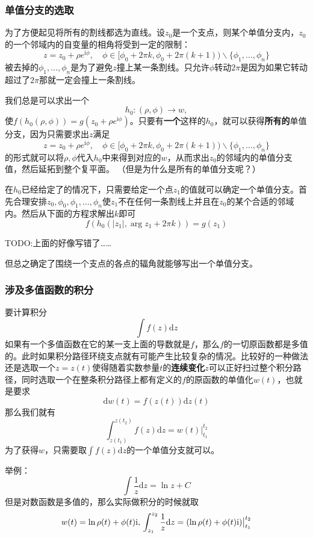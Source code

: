 \documentclass[UTF8]{ctexart}
\begin{document}
\subsubsection{单值分支的选取}
为了方便起见将所有的割线都选为直线。设$z_0$是一个支点，则某个单值分支内，$z_0$的一个邻域内的自变量的相角将受到一定的限制：
\[
z = z_0 + \rho e^{\mathrm{i} \phi}, \quad \phi \in [\phi_0 + 2\pi k, \phi_0 + 2 \pi (k+1)) \backslash \{ \phi_1, \ldots, \phi_n \}
\]
被去掉的$\phi_1, \ldots, \phi_n$是为了避免$z$撞上某一条割线。只允许$\phi$转动$2\pi$是因为如果它转动超过了$2\pi$那就一定会撞上一条割线。

我们总是可以求出一个 \[
h_0: (\rho, \phi) \longrightarrow w, 
\]
使$f(h_0(\rho, \phi)) = g(z_0 + \rho e^{\mathrm{i}\phi})$。只要有\textbf{一个}这样的$h_0$，就可以获得\textbf{所有的}单值分支，因为只需要求出$z$满足
\[
z = z_0 + \rho e^{\mathrm{i} \phi}, \quad \phi \in [\phi_0 + 2\pi k, \phi_0 + 2 \pi (k+1)) \backslash \{ \phi_1, \ldots, \phi_n \}
\]
的形式就可以将$\rho, \phi$代入$h_0$中来得到对应的$w$，从而求出$z_0$的邻域内的单值分支值，然后延拓到整个复平面。
（但是为什么是所有的单值分支呢？）

在$h_0$已经给定了的情况下，只需要给定一个点$z_1$的值就可以确定一个单值分支。首先合理安排$z_0, \phi_0, \phi_1, \ldots, \phi_n$使$z_1$不在任何一条割线上并且在$z_0$的某个合适的邻域内。然后从下面的方程求解出$k$即可
\[
f(h_0(|z_1|, \arg z_1 + 2\pi k)) = g(z_1)
\]

TODO:上面的好像写错了……

但总之确定了围绕一个支点的各点的辐角就能够写出一个单值分支。

\subsubsection{涉及多值函数的积分}

要计算积分 \[
\int f(z) \mathrm{d}z
\]
如果有一个多值函数在它的某一支上面的导数就是$f$，那么$f$的一切原函数都是多值的。此时如果积分路径环绕支点就有可能产生比较复杂的情况。比较好的一种做法还是选取一个$z=z(t)$使得随着实数参量$t$的\textbf{连续变化}$z$可以正好扫过整个积分路径，同时选取一个在整条积分路径上都有定义的$f$的原函数的单值化$w(t)$，也就是要求
\[
\mathrm{d} w(t) = f(z(t)) \mathrm{d} z(t)
\] 那么我们就有 \[
\int_{z(t_1)}^{z(t_2)} f(z) \mathrm{d}z = w(t) \big |_{t_1}^{t_2}
\]
为了获得$w$，只需要取$\int f(z) \mathrm{d}z$的一个单值分支就可以。

举例： \[
\int \frac{1}{z} \mathrm{d}z = \ln z + C
\] 但是对数函数是多值的，那么实际做积分的时候就取 \[
w(t) = \ln \rho (t) + \phi (t) \mathrm{i}, \\
\int_{z_1}^{z_2} \frac{1}{z} \mathrm{d}z = (\ln \rho (t) + \phi (t) \mathrm{i}) \big |_{t_1}^{t_2}
\]
\end{document}
